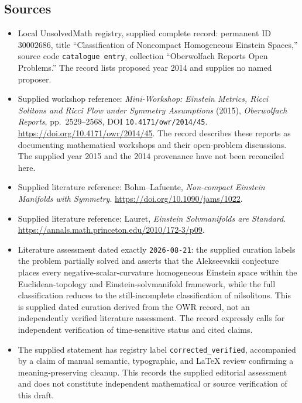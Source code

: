 \documentclass[11pt]{article}
\begin{document}
\subsection{Sources}
\begin{itemize}
\item Local UnsolvedMath registry, supplied complete record: permanent ID \(30002686\), title ``Classification of Noncompact Homogeneous Einstein Spaces,'' source code \texttt{catalogue entry}, collection ``Oberwolfach Reports Open Problems.'' The record lists proposed year 2014 and supplies no named proposer.
\item Supplied workshop reference: \emph{Mini-Workshop: Einstein Metrics, Ricci Solitons and Ricci Flow under Symmetry Assumptions} (2015), \emph{Oberwolfach Reports}, pp.\ 2529--2568, DOI \texttt{10.4171/owr/2014/45}. \url{https://doi.org/10.4171/owr/2014/45}. The record describes these reports as documenting mathematical workshops and their open-problem discussions. The supplied year 2015 and the 2014 provenance have not been reconciled here.
\item Supplied literature reference: Bohm--Lafuente, \emph{Non-compact Einstein Manifolds with Symmetry}. \url{https://doi.org/10.1090/jams/1022}.
\item Supplied literature reference: Lauret, \emph{Einstein Solvmanifolds are Standard}. \url{https://annals.math.princeton.edu/2010/172-3/p09}.
\item Literature assessment dated exactly \texttt{2026-08-21}: the supplied curation labels the problem partially solved and asserts that the Alekseevskii conjecture places every negative-scalar-curvature homogeneous Einstein space within the Euclidean-topology and Einstein-solvmanifold framework, while the full classification reduces to the still-incomplete classification of nilsolitons. This is supplied dated curation derived from the OWR record, not an independently verified literature assessment. The record expressly calls for independent verification of time-sensitive status and cited claims.
\item The supplied statement has registry label \texttt{corrected\_verified}, accompanied by a claim of manual semantic, typographic, and LaTeX review confirming a meaning-preserving cleanup. This records the supplied editorial assessment and does not constitute independent mathematical or source verification of this draft.
\end{itemize}
\end{document}
